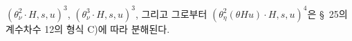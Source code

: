 
$(\theta_\nu^2\cdot H,s,u)^3$, $(\theta_\nu^3\cdot H,s,u)^3$, 그리고 그로부터 $(\theta_\eta^2(\theta Hu)\cdot H,s,u)^4$은 \S\ 25의 계수차수 12의 형식 C)에 따라 분해된다.
